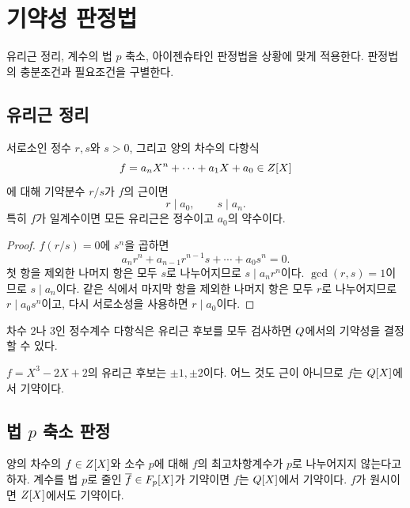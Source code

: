 \section{기약성 판정법}
\label{sec:irreducibility-tests}

\begin{learninggoal}
유리근 정리, 계수의 법 $p$ 축소, 아이젠슈타인 판정법을 상황에 맞게 적용한다. 판정법의 충분조건과 필요조건을 구별한다.
\end{learninggoal}

\subsection{유리근 정리}

\begin{theorem}[유리근 정리]
서로소인 정수 $r,s$와 $s>0$, 그리고 양의 차수의 다항식
\[
 f=a_nX^n+\cdots+a_1X+a_0\in Z[X]
\]
에 대해 기약분수 $r/s$가 $f$의 근이면
\[
  r\mid a_0,\qquad s\mid a_n.
\]
특히 $f$가 일계수이면 모든 유리근은 정수이고 $a_0$의 약수이다.
\end{theorem}

\begin{proof}
$f(r/s)=0$에 $s^n$을 곱하면
\[
 a_nr^n+a_{n-1}r^{n-1}s+\cdots+a_0s^n=0.
\]
첫 항을 제외한 나머지 항은 모두 $s$로 나누어지므로 $s\mid a_nr^n$이다. $\gcd(r,s)=1$이므로 $s\mid a_n$이다. 같은 식에서 마지막 항을 제외한 나머지 항은 모두 $r$로 나누어지므로 $r\mid a_0s^n$이고, 다시 서로소성을 사용하면 $r\mid a_0$이다.
\end{proof}

차수 $2$나 $3$인 정수계수 다항식은 유리근 후보를 모두 검사하면 $Q$에서의 기약성을 결정할 수 있다.

\begin{example}
$f=X^3-2X+2$의 유리근 후보는 $\pm1,\pm2$이다. 어느 것도 근이 아니므로 $f$는 $Q[X]$에서 기약이다.
\end{example}

\subsection{법 \texorpdfstring{$p$}{p} 축소 판정}

\begin{theorem}[축소 판정]
양의 차수의 $f\in Z[X]$와 소수 $p$에 대해 $f$의 최고차항계수가 $p$로 나누어지지 않는다고 하자. 계수를 법 $p$로 줄인 $\overline f\in F_p[X]$가 기약이면 $f$는 $Q[X]$에서 기약이다. $f$가 원시이면 $Z[X]$에서도 기약이다.
\end{theorem}

